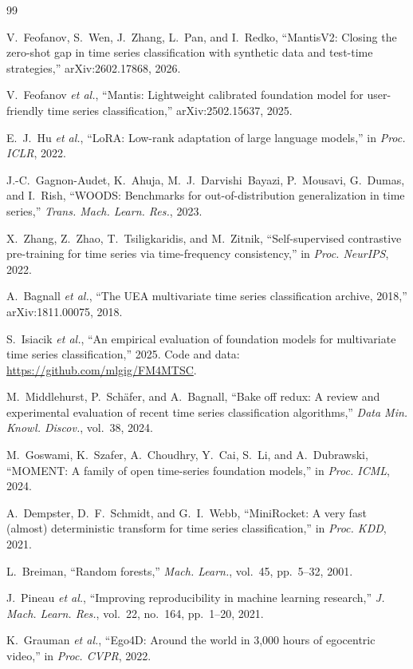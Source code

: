 \documentclass[conference]{IEEEtran}
\begin{document}
\clearpage
\begin{thebibliography}{99}
\footnotesize

 V.~Feofanov, S.~Wen, J.~Zhang, L.~Pan, and I.~Redko, ``MantisV2: Closing the zero-shot gap in
time series classification with synthetic data and test-time strategies,'' arXiv:2602.17868, 2026.

 V.~Feofanov \emph{et al.}, ``Mantis: Lightweight calibrated foundation model for user-friendly time
series classification,'' arXiv:2502.15637, 2025.

 E.~J.~Hu \emph{et al.}, ``LoRA: Low-rank adaptation of large language models,'' in \emph{Proc. ICLR},
2022.

 J.-C.~Gagnon-Audet, K.~Ahuja, M.~J.~Darvishi~Bayazi, P.~Mousavi, G.~Dumas, and I.~Rish, ``WOODS:
Benchmarks for out-of-distribution generalization in time series,'' \emph{Trans. Mach. Learn. Res.}, 2023.

 X.~Zhang, Z.~Zhao, T.~Tsiligkaridis, and M.~Zitnik, ``Self-supervised contrastive pre-training for time
series via time-frequency consistency,'' in \emph{Proc. NeurIPS}, 2022.

 A.~Bagnall \emph{et al.}, ``The UEA multivariate time series classification archive, 2018,''
arXiv:1811.00075, 2018.

 S.~Isiacik \emph{et al.}, ``An empirical evaluation of foundation models for multivariate time
series classification,'' 2025. Code and data: \url{https://github.com/mlgig/FM4MTSC}.

 M.~Middlehurst, P.~Sch\"afer, and A.~Bagnall, ``Bake off redux: A review and experimental
evaluation of recent time series classification algorithms,'' \emph{Data Min. Knowl. Discov.}, vol.~38, 2024.

 M.~Goswami, K.~Szafer, A.~Choudhry, Y.~Cai, S.~Li, and A.~Dubrawski, ``MOMENT: A family of open
time-series foundation models,'' in \emph{Proc. ICML}, 2024.

 A.~Dempster, D.~F.~Schmidt, and G.~I.~Webb, ``MiniRocket: A very fast (almost) deterministic
transform for time series classification,'' in \emph{Proc. KDD}, 2021.

 L.~Breiman, ``Random forests,'' \emph{Mach. Learn.}, vol.~45, pp.~5--32, 2001.

 J.~Pineau \emph{et al.}, ``Improving reproducibility in machine learning research,'' \emph{J. Mach.
Learn. Res.}, vol.~22, no.~164, pp.~1--20, 2021.

 K.~Grauman \emph{et al.}, ``Ego4D: Around the world in 3,000 hours of egocentric video,'' in
\emph{Proc. CVPR}, 2022.

\end{thebibliography}
\end{document}
